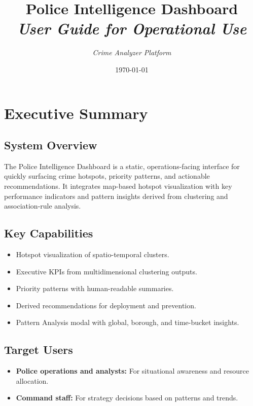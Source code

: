 \documentclass[11pt]{article}
\title{\Huge\textbf{Police Intelligence Dashboard}\\[2mm]
       \Large\textit{User Guide for Operational Use}}
\author{\textit{Crime Analyzer Platform}}
\date{\today}
\begin{document}
\maketitle
\tableofcontents
\newpage

\section{Executive Summary}

\subsection{System Overview}
The Police Intelligence Dashboard is a static, operations-facing interface for quickly surfacing crime hotspots, priority patterns, and actionable recommendations. It integrates map-based hotspot visualization with key performance indicators and pattern insights derived from clustering and association-rule analysis.

\subsection{Key Capabilities}
\begin{itemize}[leftmargin=*]
  \item Hotspot visualization of spatio-temporal clusters.
  \item Executive KPIs from multidimensional clustering outputs.
  \item Priority patterns with human-readable summaries.
  \item Derived recommendations for deployment and prevention.
  \item Pattern Analysis modal with global, borough, and time-bucket insights.
\end{itemize}

\subsection{Target Users}
\begin{itemize}[leftmargin=*]
  \item \textbf{Police operations and analysts:} For situational awareness and resource allocation.
  \item \textbf{Command staff:} For strategy decisions based on patterns and trends.
\end{itemize}

\end{document}
